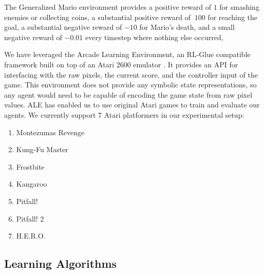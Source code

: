 \documentclass{article}
\begin{document}
The Generalized Mario environment provides a positive reward of $1$ for smashing enemies or collecting coins, a substantial positive reward of $~100$ for reaching the goal, a substantial negative reward of $-10$ for Mario's death, and a small negative reward of $-0.01$ every timestep where nothing else occurred, 

We have leveraged the Arcade Learning Environment, an RL-Glue compatible framework built on top of an Atari 2600 emulator \cite{bellemare13}.  It provides an API for interfacing with the raw pixels, the current score, and the controller input of the game. This environment does not provide any symbolic state representations, so any agent would need to be capable of encoding the game state from raw pixel values. ALE has enabled us to use original Atari games to train and evaluate our agents. We currently support 7 Atari platformers in our experimental setup:

\begin{multicols}{2}
\begin{enumerate} [topsep=0pt,itemsep=-1ex,partopsep=1ex,parsep=1ex]
\item Montezumas Revenge
\item Kung-Fu Master
\item Frostbite
\item Kangaroo
\item Pitfall!
\item Pitfall! 2
\item H.E.R.O.
\end{enumerate}
\end{multicols}

\subsection{Learning Algorithms}
\end{document}
